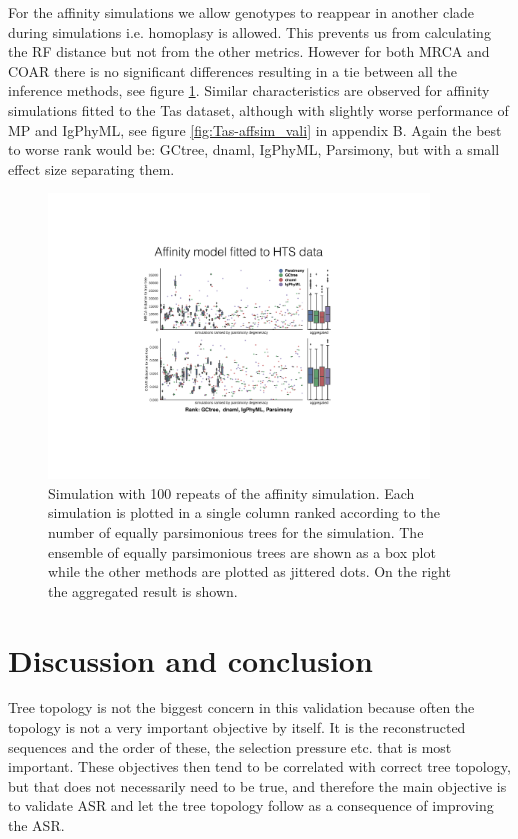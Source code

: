 For the affinity simulations we allow genotypes to reappear in another clade during simulations i.e. homoplasy is allowed.
This prevents us from calculating the RF distance but not from the other metrics.
However for both MRCA and COAR there is no significant differences resulting in a tie between all the inference methods, see figure \ref{fig:Laura-affsim_valid}.
Similar characteristics are observed for affinity simulations fitted to the Tas dataset, although with slightly worse performance of MP and IgPhyML, see figure \ref{fig:Tas-affsim_vali} in appendix B.
Again the best to worse rank would be: GCtree, dnaml, IgPhyML, Parsimony, but with a small effect size separating them.

\begin{figure}[!ht]
    \centering
    \includegraphics[width=0.9\textwidth]{figures/Laura-affsim_valid.pdf}
    \caption{
        \label{fig:Laura-affsim_valid}
        Simulation with 100 repeats of the affinity simulation.
        Each simulation is plotted in a single column ranked according to the number of equally parsimonious trees for the simulation.
        The ensemble of equally parsimonious trees are shown as a box plot while the other methods are plotted as jittered dots.
        On the right the aggregated result is shown.
    }
\end{figure}






\section{Discussion and conclusion}
Tree topology is not the biggest concern in this validation because often the topology is not a very important objective by itself.
It is the reconstructed sequences and the order of these, the selection pressure etc. that is most important.
These objectives then tend to be correlated with correct tree topology, but that does not necessarily need to be true, and therefore the main objective is to validate ASR and let the tree topology follow as a consequence of improving the ASR.


